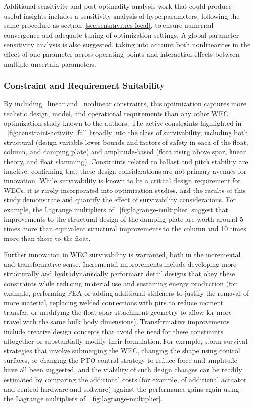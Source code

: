 Additional sensitivity and post-optimality analysis work that could produce useful insights includes a sensitivity analysis of hyperparameters, following the same procedure as section~\ref{sec:sensitivities-local}, to ensure numerical convergence and adequate tuning of optimization settings.
A global parameter sensitivity analysis is also suggested, taking into account both nonlinearites in the effect of one parameter across operating points and interaction effects between multiple uncertain parameters.

\subsubsection{Constraint and Requirement Suitability}
By including \numLinConstraints~linear and \numNonlinConstraints~nonlinear constraints, this optimization captures more realistic design, model, and operational requirements than any other WEC optimization study known to the authors.
The active constraints highlighted in \figureautorefname~\ref{fig:constraint-activity} fall broadly into the class of survivability, including both structural (design variable lower bounds and factors of safety in each of the float, column, and damping plate) and amplitude-based (float rising above spar, linear theory, and float slamming). 
Constraints related to ballast and pitch stability are inactive, confirming that these design considerations are not primary avenues for innovation.
While survivability is known to be a critical design requirement for WECs, it is rarely incorporated into optimization studies, and the results of this study demonstrate and quantify the effect of survivability considerations. 
For example, the Lagrange multipliers of \figureautorefname~\ref{fig:lagrange-multiplier} suggest that improvements to the structural design of the damping plate are worth around 5 times more than equivalent structural improvements to the column and 10 times more than those to the float.

Further innovation in WEC survivability is warranted, both in the incremental and transformative sense.
Incremental improvements include developing more structurally and hydrodynamically performant detail designs that obey these constraints while reducing material use and sustaining energy production (for example, performing FEA or adding additional stiffeners to justify the removal of more material, replacing welded connections with pins to reduce moment transfer, or modifying the float-spar attachment geometry to allow for more travel with the same bulk body dimensions).
Transformative improvements include creative design concepts that avoid the need for these constraints altogether or substantially modify their formulation.
For example, storm survival strategies that involve submerging the WEC, changing the shape using control surfaces, or changing the PTO control strategy to reduce force and amplitude have all been suggested, and the viability of such design changes can be readily estimated by comparing the additional costs (for example, of additional actuator and control hardware and software) against the performance gains again using the Lagrange multipliers of \figureautorefname~\ref{fig:lagrange-multiplier}.

